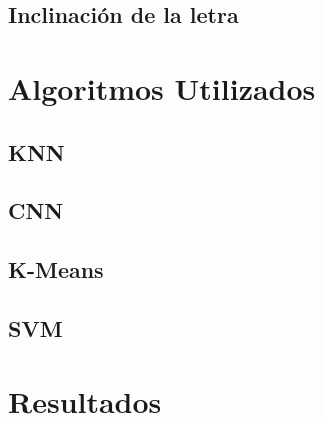 \documentclass[10pt, a4paper]{article}
\begin{document}
\subsection{Inclinaci\'on de la letra}

\section{Algoritmos Utilizados}
\subsection{KNN}
\subsection{CNN}
\subsection{K-Means}
\subsection{SVM}
\section{Resultados}
\end{document}
